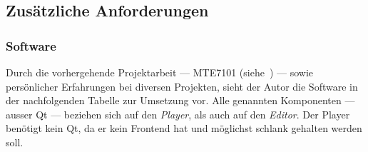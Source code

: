 
\subsection{Zusätzliche Anforderungen}
\label{subsec::requirements:additional-requirements}

\subsubsection{Software}
\label{subsec::requirements:additional-requirements:software}

Durch die vorhergehende Projektarbeit --- MTE7101
(siehe~\cite{osterwalder_sven_volume_2016}) --- sowie persönlicher Erfahrungen
bei diversen Projekten, sieht der Autor die Software in der
nachfolgenden Tabelle zur Umsetzung vor. Alle genannten Komponenten --- ausser
Qt --- beziehen sich auf den \textit{Player}, als auch auf den \textit{Editor}.
Der Player benötigt kein Qt, da er kein Frontend hat und möglichst schlank
gehalten werden soll.

